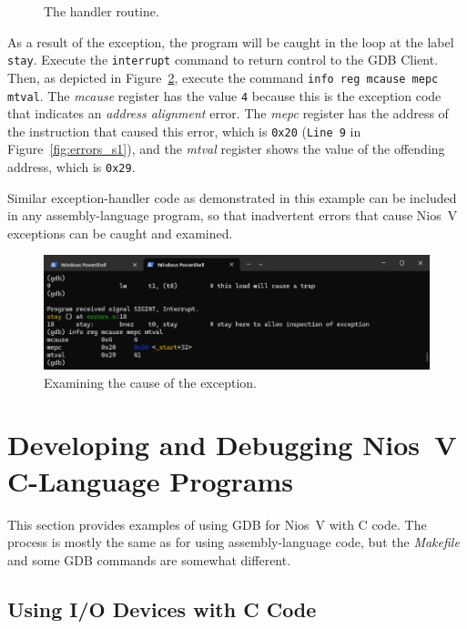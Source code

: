 \documentclass[11pt, twoside, pdftex]{article}
\begin{document}
\begin{figure}[H]

	\caption{The handler routine.}
	\label{fig:errors_s2}
\end{figure}

As a result of the exception, the program will be caught in the loop at the label \texttt{stay}. 
Execute the \texttt{interrupt} command to return control to the GDB Client. Then, as depicted in 
Figure~\ref{fig:errors_s3}, execute the command \texttt{info reg mcause mepc mtval}. The
{\it mcause} register has the value \texttt{4} because this is the exception code that
indicates an {\it address alignment} error. The {\it mepc} register has the address of the
instruction that caused this error, which is \texttt{0x20} (\texttt{Line 9} in
Figure~\ref{fig:errors_s1}), and the {\it mtval} register shows the value of the offending
address, which is \texttt{0x29}. 

Similar exception-handler code as demonstrated in this example can be included in any
assembly-language program, so that inadvertent errors that cause Nios~V exceptions can be 
caught and examined. 

\begin{figure}[h]
    \begin{center}
        \includegraphics[scale=.6]{figures/errors_s3.png}
        \caption{Examining the cause of the exception.}
        \label{fig:errors_s3}
    \end{center}
\end{figure}

\section{Developing and Debugging Nios~V C-Language Programs}
\label{sec:c-code}

This section provides examples of using GDB for Nios~V with C code. The process is mostly
the same as for using assembly-language code, but the {\it Makefile} and some GDB commands are
somewhat different. 

\subsection{Using I/O Devices with C Code}
\end{document}
